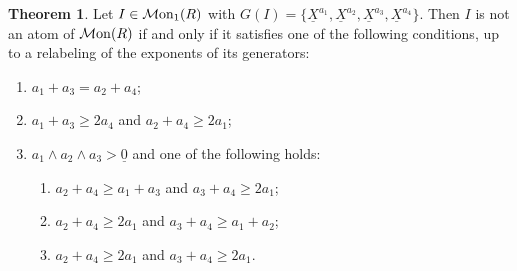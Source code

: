 \documentclass[a4paper,10pt,reqno]{amsart}
\theoremstyle{definition}
\newtheorem{theorem}{Theorem}[section]
\theoremstyle{definition}
\providecommand\Mon{{\mathcal{M}{\rm on}}}
\begin{document}
\begin{theorem}\label{thm: 4-generated}
Let $I\in \Mon_1(R)$ with $G(I) = \{\underline X^{a_1},\underline X^{a_{2}}, \underline X^{a_3}, \underline X^{a_4}\}$. Then $I$ is not an atom of $\Mon(R)$ if and only if it satisfies one of the following conditions, up to a relabeling of the exponents of its generators:
\begin{enumerate}[label=\textup{(c\arabic{*})}, mode=unboxed]
 \item \label{mu4 c1} $a_1+a_3=a_2+a_4$; 
 \item \label{mu4 c2} $a_1+a_3\ge 2a_4$ and $a_2+a_4\ge 2a_1$; 
 \item \label{mu4 c3} $a_1\wedge a_2\wedge a_3>\underline 0$ and one of the following holds:
        \begin{enumerate}[label=\textup{(\roman{*})}, mode=unboxed]
            \item \label{mu4 c31} $a_2+a_4\ge a_1+a_3$ and $a_3+a_4\ge 2a_1$;
            \item \label{mu4 c32} $a_2+a_4\ge 2a_1$ and $a_3+a_4\ge a_1+a_2$;
            \item \label{mu4 c33} $a_2+a_4\ge 2a_1$ and $a_3+a_4\ge 2a_1$.
        \end{enumerate}
    \end{enumerate}
\end{theorem}
\end{document}
